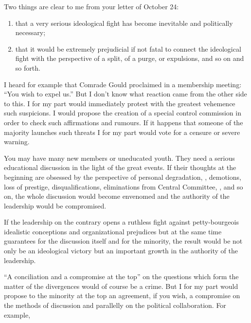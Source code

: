 

Two things are clear to me from your letter of October 24:

\begin{enumerate}
  \item that a very serious ideological fight has become inevitable and politically necessary;
  \item that it would be extremely prejudicial if not fatal to connect the ideological fight with the perspective of a split, of a purge, or expulsions, and so on and so forth.
\end{enumerate}

I heard for example that Comrade Gould proclaimed in a membership meeting: “You wish to expel us.” But I don’t know what reaction came from the other side to this. I for my part would immediately protest with the greatest vehemence such suspicions. I would propose the creation of a special control commission in order to check such affirmations and rumours. If it happens that someone of the majority launches such threats I for my part would vote for a censure or severe warning.

You may have many new members or uneducated youth. They need a serious educational discussion in the light of the great events. If their thoughts at the beginning are obsessed by the perspective of personal degradation, \ie, demotions, loss of prestige, disqualifications, eliminations from Central Committee, \etc, and so on, the whole discussion would become envenomed and the authority of the leadership would be compromised.

If the leadership on the contrary opens a ruthless fight against petty-bourgeois idealistic conceptions and organizational prejudices but at the same time guarantees for the discussion itself and for the minority, the result would be not only be an ideological victory but an important growth in the authority of the leadership.

“A conciliation and a compromise at the top” on the questions which form the matter of the divergences would of course be a crime. But I for my part would propose to the minority at the top an agreement, if you wish, a compromise on the methods of discussion and parallelly on the political collaboration. For example,

